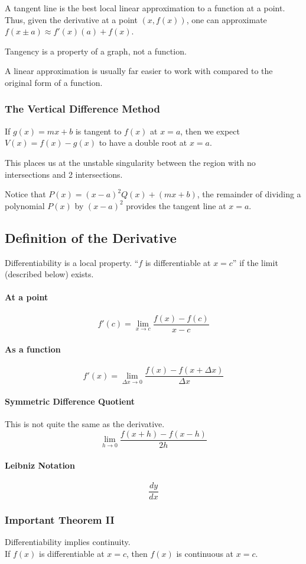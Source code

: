 \documentclass{article}
\begin{document}
A tangent line is the best local linear approximation to a function at a point. Thus, given the derivative at a point $(x, f(x))$, one can approximate $f(x\pm a) \approx f'(x)(a) + f(x)$.

Tangency is a property of a graph, not a function.

A linear approximation is usually far easier to work with compared to the original form of a function.

\subsubsection{The Vertical Difference Method}
If $g(x)=mx+b$ is tangent to $f(x)$ at $x=a$, then we expect $V(x) = f(x) - g(x)$ to have a double root at $x=a$.

This places us at the unstable singularity between the region with no intersections and 2 intersections.

Notice that $P(x) = (x-a)^2Q(x) + (mx+b)$, the remainder of dividing a polynomial $P(x)$ by $(x-a)^2$ provides the tangent line at $x=a$.
\subsection{Definition of the Derivative}
Differentiability is a local property. ``$f$ is differentiable at $x=c$'' if the limit (described below) exists.
\paragraph{At a point}
$$f'(c) = \lim_{x\to c} \frac{f(x) - f(c)}{x-c}$$

\paragraph{As a function}
$$f'(x) = \lim_{\Delta x\to 0} \frac{f(x) - f(x+\Delta x)}{\Delta x}$$

\paragraph{Symmetric Difference Quotient}
This is not quite the same as the derivative.
$$\lim_{h\to 0} \frac{f(x+h) - f(x-h)}{2h}$$

\paragraph{Leibniz Notation}
$$\frac{dy}{dx}$$
\subsubsection{Important Theorem II}
Differentiability implies continuity.\\
If $f(x)$ is differentiable at $x=c$, then $f(x)$ is continuous at $x=c$.
\end{document}
